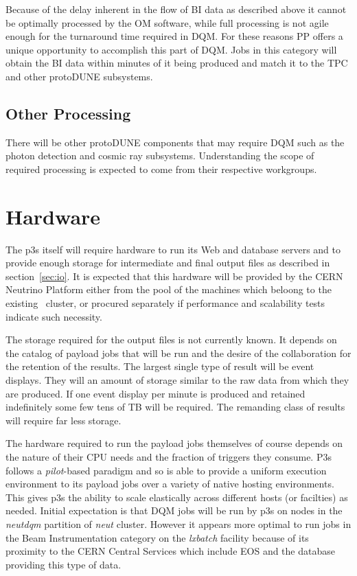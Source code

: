 \documentclass[pdftex,12pt,letter]{article}
\newcommand{\pd}{protoDUNE\xspace}
\begin{document}
Because of the delay  inherent in the flow of BI data as described above
it cannot be optimally processed by the OM software,
while full processing is not agile enough for the turnaround time required
in DQM. For these reasons PP offers a unique opportunity to accomplish
this part of DQM. Jobs in this category will obtain the BI data within
minutes of it being produced and match it to the TPC and other
\pd subsystems.

\subsection{Other Processing}
There will be other \pd components that may require DQM such as the photon detection
and cosmic ray subsystems. Understanding the scope of required processing is expected
to come from their respective workgroups.

\section{Hardware}
\label{sec:hardware}
The p3s itself will require hardware to run its Web and database
servers and to provide enough storage for intermediate and final
output files as described in section~\ref{sec:io}.  It is expected
that this hardware will be provided by the CERN Neutrino Platform
either from the pool of the machines which beloong to the
existing~\cite{neut} cluster, or procured separately if performance
and scalability tests indicate such necessity.


The storage required for the output files is not currently known.  It
depends on the catalog of payload jobs that will be run and the desire
of the collaboration for the retention of the results.  The largest
single type of result will be event displays.  They will an amount of
storage similar to the raw data from which they are produced.  If one
event display per minute is produced and retained indefinitely some
few tens of TB will be required.  The remanding class of results will
require far less storage.

The hardware required to run the payload jobs themselves of course
depends on the nature of their CPU needs and the fraction of triggers
they consume.  P3s follows a \textit{pilot}-based paradigm and so is
able to provide a uniform execution environment to its payload jobs
over a variety of native hosting environments.  This gives p3s the ability
to scale elastically across different hosts (or facilties) as needed.  Initial expectation
is that DQM jobs will be run by p3s on nodes in the \textit{neutdqm}
partition of \textit{neut} cluster. However it appears more optimal
to run jobs in the Beam Instrumentation category on the
\textit{lxbatch} \cite{lxbatch} facility because of its proximity to
the CERN Central Services which include EOS and the database
providing this type of data.
\end{document}
